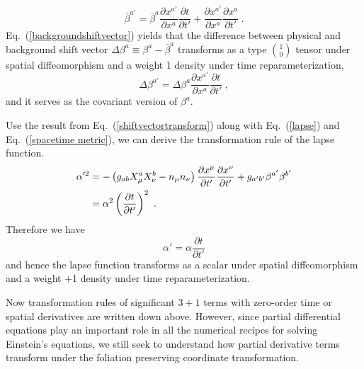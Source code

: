 \begin{equation}\label{backgroundshiftvector}
{\bar \beta}^{a'} = {\bar \beta}^{a}\frac{\partial x^{a'}}{\partial x^{a}}\frac{\partial t}{\partial t'} + \frac{\partial x^{a'}}{\partial x^{a}}\frac{\partial x^{a}}{\partial t'} \ .
\end{equation}
Eq.~(\ref{backgroundshiftvector}) yields that the difference between physical and background shift vector $\Delta \beta^{a} \equiv \beta^{a} - {\bar \beta}^{a}$ transforms as a type $1 \choose 0$ tensor under spatial diffeomorphism and a weight 1 density under time reparameterization, 
\begin{equation}\label{covariantshiftvector}
	\Delta \beta^{a'} = \Delta \beta^{a}\frac{\partial x^{a'}}{\partial x^{a}}\frac{\partial t}{\partial t'} \ ,
\end{equation}
and it serves as the covariant version of $\beta^{a}$. 

Use the result from Eq.~(\ref{shiftvectortransform}) along with Eq.~(\ref{lapse}) and Eq.~(\ref{spacetime metric}), we can derive the transformation rule of the lapse function. 
\begin{align*}
\alpha'^{2} & = - \left(g_{ab}X^{a}_{\mu}X^{b}_{\nu} - n_{\mu}n_{\nu}\right)\frac{\partial x^{\mu}}{\partial t'}\frac{\partial x^{\nu}}{\partial t'} + g_{a'b'}\beta^{a'}\beta^{b'}\notag\\ 
& = \alpha^2\left(\frac{\partial t}{\partial t'}\right)^{2} \ .
\end{align*}
Therefore we have
\begin{equation}\label{lapsetransform}
\alpha' = \alpha\frac{\partial t}{\partial t'}
\end{equation}
and hence the lapse function transforms as a scalar under spatial diffeomorphism and a weight +1 density under time reparameterization. 

Now transformation rules of significant $3 + 1$ terms with zero-order time or spatial derivatives are written down above. However, since partial differential equations play an important role in all the numerical recipes for solving Einstein's equations, we still seek to understand how partial derivative terms transform under the foliation preserving coordinate transformation. 

